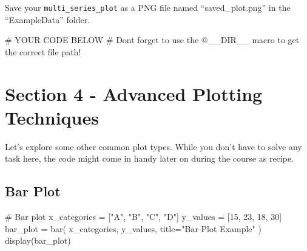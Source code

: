 \documentclass[
]{report}
\newenvironment{Shaded}{\begin{snugshade}}{\end{snugshade}}
\newcommand{\CommentTok}[1]{\textcolor[rgb]{0.37,0.37,0.37}{#1}}
\newcommand{\FloatTok}[1]{\textcolor[rgb]{0.68,0.00,0.00}{#1}}
\newcommand{\FunctionTok}[1]{\textcolor[rgb]{0.28,0.35,0.67}{#1}}
\newcommand{\NormalTok}[1]{\textcolor[rgb]{0.00,0.23,0.31}{#1}}
\newcommand{\OperatorTok}[1]{\textcolor[rgb]{0.37,0.37,0.37}{#1}}
\newcommand{\PreprocessorTok}[1]{\textcolor[rgb]{0.68,0.00,0.00}{#1}}
\newcommand{\SpecialCharTok}[1]{\textcolor[rgb]{0.37,0.37,0.37}{#1}}
\newcommand{\StringTok}[1]{\textcolor[rgb]{0.13,0.47,0.30}{#1}}
\begin{document}
Save your \texttt{multi\_series\_plot} as a PNG file named
``saved\_plot.png'' in the ``ExampleData'' folder.

\begin{Shaded}
\begin{Highlighting}[]
\CommentTok{\# YOUR CODE BELOW}
\CommentTok{\# Don\textquotesingle{}t forget to use the @\_\_DIR\_\_ macro to get the correct file path!}
\end{Highlighting}
\end{Shaded}

\begin{Shaded}
\end{Shaded}

\chapter{Section 4 - Advanced Plotting
Techniques}\label{section-4---advanced-plotting-techniques}

Let's explore some other common plot types. While you don't have to
solve any task here, the code might come in handy later on during the
course as recipe.

\section{Bar Plot}\label{bar-plot}

\begin{Shaded}
\begin{Highlighting}[]
\CommentTok{\# Bar plot}
\NormalTok{x\_categories }\OperatorTok{=}\NormalTok{ [}\StringTok{"A"}\NormalTok{, }\StringTok{"B"}\NormalTok{, }\StringTok{"C"}\NormalTok{, }\StringTok{"D"}\NormalTok{]}
\NormalTok{y\_values }\OperatorTok{=}\NormalTok{ [}\FloatTok{15}\NormalTok{, }\FloatTok{23}\NormalTok{, }\FloatTok{18}\NormalTok{, }\FloatTok{30}\NormalTok{]}
\NormalTok{bar\_plot }\OperatorTok{=} \FunctionTok{bar}\NormalTok{(}
\NormalTok{    x\_categories, }
\NormalTok{    y\_values, }
\NormalTok{    title}\OperatorTok{=}\StringTok{"Bar Plot Example"}
\NormalTok{)}
\FunctionTok{display}\NormalTok{(bar\_plot)}
\end{Highlighting}
\end{Shaded}
\end{document}
